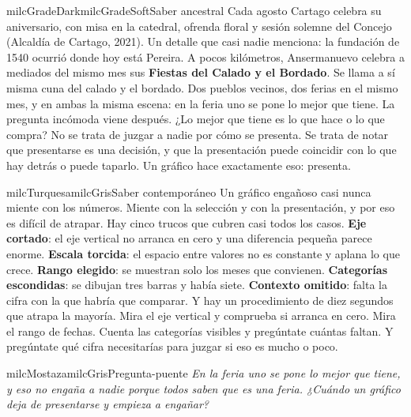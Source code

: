 \documentclass[11pt,letterpaper]{article}
\begin{document}
\begin{softbox}{milcGradeDark}{milcGradeSoft}{Saber ancestral}
Cada agosto Cartago celebra su aniversario, con misa en la catedral, ofrenda floral y sesión solemne del Concejo (Alcaldía de Cartago, 2021). Un detalle que casi nadie menciona: la fundación de 1540 ocurrió donde hoy está Pereira. A pocos kilómetros, Ansermanuevo celebra a mediados del mismo mes sus \textbf{Fiestas del Calado y el Bordado}. Se llama a sí misma cuna del calado y el bordado. Dos pueblos vecinos, dos ferias en el mismo mes, y en ambas la misma escena: en la feria uno se pone lo mejor que tiene. La pregunta incómoda viene después. ¿Lo mejor que tiene es lo que hace o lo que compra? No se trata de juzgar a nadie por cómo se presenta. Se trata de notar que presentarse es una decisión, y que la presentación puede coincidir con lo que hay detrás o puede taparlo. Un gráfico hace exactamente eso: presenta.\par{}
\end{softbox}

\begin{softbox}{milcTurquesa}{milcGris}{Saber contemporáneo}
Un gráfico engañoso casi nunca miente con los números. Miente con la selección y con la presentación, y por eso es difícil de atrapar. Hay cinco trucos que cubren casi todos los casos. \textbf{Eje cortado}: el eje vertical no arranca en cero y una diferencia pequeña parece enorme. \textbf{Escala torcida}: el espacio entre valores no es constante y aplana lo que crece. \textbf{Rango elegido}: se muestran solo los meses que convienen. \textbf{Categorías escondidas}: se dibujan tres barras y había siete. \textbf{Contexto omitido}: falta la cifra con la que habría que comparar. Y hay un procedimiento de diez segundos que atrapa la mayoría. Mira el eje vertical y comprueba si arranca en cero. Mira el rango de fechas. Cuenta las categorías visibles y pregúntate cuántas faltan. Y pregúntate qué cifra necesitarías para juzgar si eso es mucho o poco.
\end{softbox}

\begin{softbox}{milcMostaza}{milcGris}{Pregunta-puente}
\textit{En la feria uno se pone lo mejor que tiene, y eso no engaña a nadie porque todos saben que es una feria. ¿Cuándo un gráfico deja de presentarse y empieza a engañar?}
\end{softbox}
\end{document}
